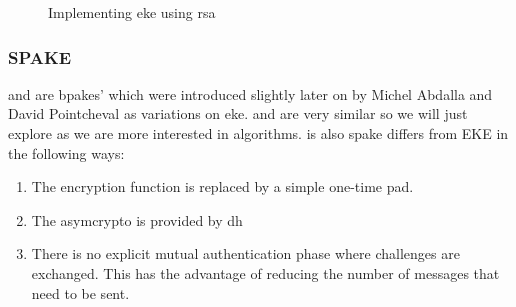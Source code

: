 \begin{figure}[H]

  \caption{Implementing \gls{eke} using \gls{rsa}}
  \label{fig:eke-rsa}
\end{figure}

\clearpage

\subsubsection{SPAKE}
 and  are \glspl{bpake}' which were introduced slightly later on by Michel Abdalla and David Pointcheval\cite{spake} as variations on \gls{eke}.
 and  are very similar so we will just explore  as we are more interested in  algorithms.
 is also 
\gls{spake} differs from EKE in the following ways:

\begin{enumerate}
  \item The encryption function is replaced by a simple one-time pad.
  \item The \gls{asymcrypto} is provided by \gls{dh}
  \item There is no explicit mutual authentication phase where challenges are exchanged.
    This has the advantage of reducing the number of messages that need to be sent.
\end{enumerate}

